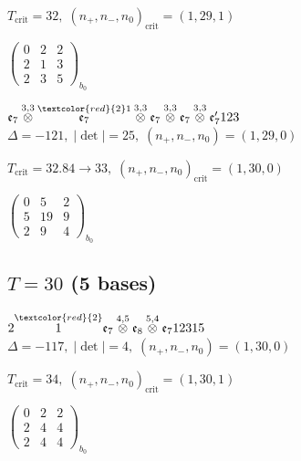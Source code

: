 \documentclass[10pt]{article}
\begin{document}
\hspace{1em}$T_{\text{crit}}=32,\; (n_+,n_-,n_0)_{\text{crit}}=(1,29,1)$

\hspace{2em}$\left(\begin{smallmatrix}0 & 2 & 2 \\ 2 & 1 & 3 \\ 2 & 3 & 5\end{smallmatrix}\right)_{\!b_0}$

\smallskip

$\mathfrak{e}_7\overset{3,3}{\otimes}\overset{\textcolor{red}{2}1}{\mathfrak{e}_7}\overset{3,3}{\otimes}\mathfrak{e}_7\overset{3,3}{\otimes}\mathfrak{e}_7\overset{3,3}{\otimes}\mathfrak{e}_7'123$ \quad $\Delta=-121,\; |\det|=25,\; (n_+,n_-,n_0)=(1,29,0)$

\hspace{1em}$T_{\text{crit}}=32.84 \to 33,\; (n_+,n_-,n_0)_{\text{crit}}=(1,30,0)$

\hspace{2em}$\left(\begin{smallmatrix}0 & 5 & 2 \\ 5 & 19 & 9 \\ 2 & 9 & 4\end{smallmatrix}\right)_{\!b_0}$


\subsection*{$T = 30$ \quad (5 bases)}
\smallskip

$2\overset{\textcolor{red}{2}}{1}\mathfrak{e}_7\overset{4,5}{\otimes}\mathfrak{e}_8\overset{5,4}{\otimes}\mathfrak{e}_712315$ \quad $\Delta=-117,\; |\det|=4,\; (n_+,n_-,n_0)=(1,30,0)$

\hspace{1em}$T_{\text{crit}}=34,\; (n_+,n_-,n_0)_{\text{crit}}=(1,30,1)$

\hspace{2em}$\left(\begin{smallmatrix}0 & 2 & 2 \\ 2 & 4 & 4 \\ 2 & 4 & 4\end{smallmatrix}\right)_{\!b_0}$
\end{document}

